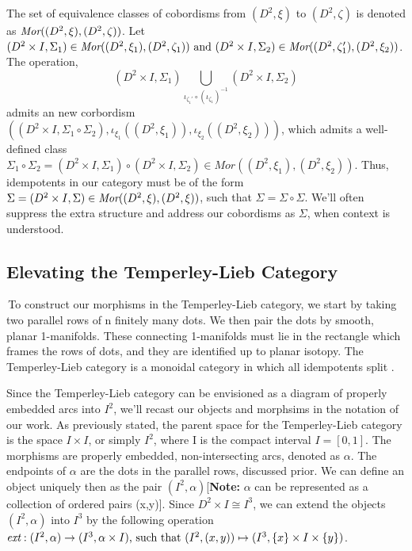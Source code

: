 \documentclass[11pt]{article}
\newcommand{\TL}{Temperley-Lieb }
\newcommand{\parent}{D^2\times I}
\begin{document}
The set of equivalence classes of cobordisms from $(D^2, \xi)$ to $(D^2,\zeta)$ is denoted as $\emph{Mor}((D^2,\xi),(D^2,\zeta))$. Let $(\parent,\Sigma_1)\in\emph{Mor}((D^2,\xi_1),(D^2,\zeta_1))\text{ and }(\parent,\Sigma_2)\in\emph{Mor}((D^2,\zeta_1'),(D^2,\xi_2))$. The operation, 
\[ (\parent,\Sigma_1) \bigcup_{\iota_{\zeta_1'}\circ(\iota_{\zeta_1})^{-1}}(\parent,\Sigma_2)\]
admits an new corbordism $((\parent,\Sigma_1\circ\Sigma_2),\iota_{\xi_1}((D^2,\xi_1)),\iota_{\xi_2}((D^2,\xi_2)))$, which admits a well-defined class $\Sigma_1\circ\Sigma_2=(\parent,\Sigma_1)\circ(\parent,\Sigma_2)\in\textit{Mor}((D^2,\xi_1),(D^2,\xi_2))$. Thus, idempotents in our category must be of the form $\Sigma=(\parent,\Sigma)\in\emph{Mor}((D^2,\xi),(D^2,\xi))$, such that $\Sigma = \Sigma\circ\Sigma$. We'll often suppress the extra structure and address our cobordisms as $\Sigma$, when context is understood.
\vspace{5mm}







\subsection*{Elevating the Temperley-Lieb Category}
\,\indent	To construct our morphisms in the \TL category, we start by taking two parallel rows of n finitely many dots. We then pair the dots by smooth, planar 1-manifolds. These connecting 1-manifolds must lie in the rectangle which frames the rows of dots, and they are identified up to planar isotopy. The \TL category is a monoidal category in which all idempotents split \cite{Abramsky}. 

Since the \TL category can be envisioned as a diagram of properly embedded arcs into $I^2$, we'll recast our objects and morphsims in the notation of our work. As previously stated, the parent space for the \TL category is the space $I\times I$, or simply $I^2$, where I is the compact interval $I = [0,1]$. The morphisms are properly embedded, non-intersecting arcs, denoted as $\alpha$. The endpoints of $\alpha$ are the dots in the parallel rows, discussed prior. We can define an object uniquely then as the pair $(I^2, \alpha)$[\textbf{Note:} $\alpha$ can be represented as a collection of ordered pairs (x,y)]. Since $\parent \cong I^3$, we can extend the objects $(I^2,\alpha)$ into $I^3$ by the following operation $\emph{ext}: (I^2,\alpha)\rightarrow(I^3, \alpha\times I) \text{, such that } (I^2,(x,y)) \mapsto (I^3, \{ x \}\times I\times\{ y \})$.
\end{document}
